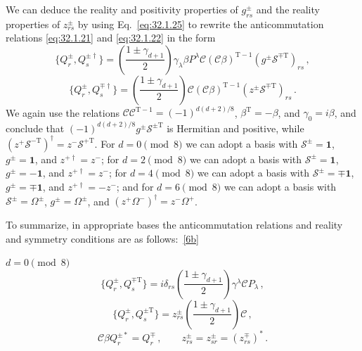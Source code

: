 We can deduce the reality and positivity properties of \(g_{rs}^{\pm}\)
and the reality properties of \(z_{rs}^{\pm}\) by using
Eq.~\eqref{eq:32.1.25} to rewrite the anticommutation relations
\eqref{eq:32.1.21} and \eqref{eq:32.1.22} in the form
\begin{equation}
  \{Q_r^\pm,Q_s^{\pm\dagger}\}
  =
  \left(\frac{1\pm\gamma_{d+1}}{2}\right)
  \gamma_\lambda\beta P^\lambda
  \mathcal C(\mathcal C\beta)^{\mathrm T-1}
  (g^\pm\mathcal S^{\mp\mathrm T})_{rs}\,,
  \tag{32.1.27}\label{eq:32.1.27}
\end{equation}
\begin{equation}
  \{Q_r^\pm,Q_s^{\mp\dagger}\}
  =
  \left(\frac{1\pm\gamma_{d+1}}{2}\right)
  \mathcal C(\mathcal C\beta)^{\mathrm T-1}
  (z^\pm\mathcal S^{\mp\mathrm T})_{rs}\,.
  \tag{32.1.28}\label{eq:32.1.28}
\end{equation}
We again use the relations
\(\mathcal C\mathcal C^{\mathrm T-1}=(-1)^{d(d+2)/8}\),
\(\beta^{\mathrm T}=-\beta\), and \(\gamma_0=i\beta\), and conclude that
\((-1)^{d(d+2)/8}g^\pm\mathcal S^{\pm\mathrm T}\) is Hermitian and
positive, while
\((z^+\mathcal S^{-\mathrm T})^\dagger=z^-\mathcal S^{+\mathrm T}\).
For \(d=0\pmod 8\) we can adopt a basis with
\(\mathcal S^\pm=\mathbf{1}\), \(g^\pm=\mathbf{1}\), and
\(z^{+\dagger}=z^-\); for \(d=2\pmod 8\) we can adopt a basis with
\(\mathcal S^\pm=\mathbf{1}\), \(g^\pm=-\mathbf{1}\), and
\(z^{+\dagger}=z^-\); for \(d=4\pmod 8\) we can adopt a basis with
\(\mathcal S^\pm=\mp\mathbf{1}\), \(g^\pm=\mp\mathbf{1}\), and
\(z^{+\dagger}=-z^-\); and for \(d=6\pmod 8\) we can adopt a basis with
\(\mathcal S^\pm=\Omega^\pm\), \(g^\pm=\Omega^\pm\), and
\((z^+\Omega^-)^\dagger=z^-\Omega^+\).

To summarize, in appropriate bases the anticommutation relations and reality
and symmetry conditions are as follows:~\hyperref[ch32-ref-6b]{[6b]}

\medskip
\noindent \(d=0\pmod 8\)
\begin{equation}
  \{Q_r^\pm,Q_s^{\mp\mathrm T}\}
  =i\delta_{rs}
  \left(\frac{1\pm\gamma_{d+1}}{2}\right)
  \gamma^\lambda\mathcal C P_\lambda\,,
  \tag{32.1.29}\label{eq:32.1.29}
\end{equation}
\begin{equation}
  \{Q_r^\pm,Q_s^{\pm\mathrm T}\}
  =z_{rs}^{\pm}
  \left(\frac{1\pm\gamma_{d+1}}{2}\right)\mathcal C\,,
  \tag{32.1.30}\label{eq:32.1.30}
\end{equation}
\begin{equation}
  \mathcal C\beta Q_r^{\pm*}=Q_r^\mp\,,
  \qquad
  z_{rs}^{\pm}=z_{sr}^{\pm}=(z_{rs}^{\mp})^*\,.
  \tag{32.1.31}\label{eq:32.1.31}
\end{equation}

